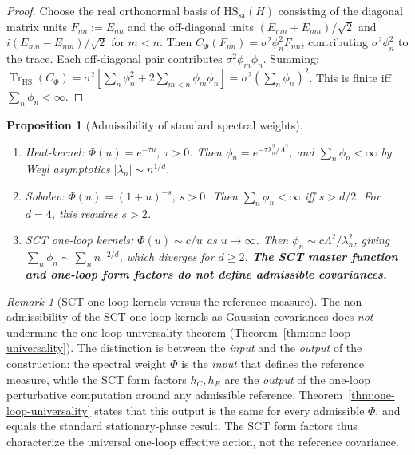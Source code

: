 \documentclass[12pt,a4paper]{article}
\theoremstyle{plain}
\newtheorem{proposition}[theorem]{Proposition}
\theoremstyle{definition}
\theoremstyle{remark}
\newtheorem{remark}[theorem]{Remark}
\newcommand{\Tr}{\operatorname{Tr}}
\newcommand{\HS}{\mathrm{HS}}
\newcommand{\sa}{\mathrm{sa}}
\newcommand{\Lam}{\Lambda}
\begin{document}
\begin{proof}
Choose the real orthonormal basis of $\HS_\sa(H)$ consisting of the
diagonal matrix units $F_{nn} := E_{nn}$ and the off-diagonal units
$(E_{mn} + E_{nm})/\sqrt{2}$ and $i(E_{mn} - E_{nm})/\sqrt{2}$ for
$m < n$.  Then $C_\Phi(F_{nn}) = \sigma^2 \phi_n^2 F_{nn}$,
contributing $\sigma^2\phi_n^2$ to the trace.  Each off-diagonal pair
contributes $\sigma^2 \phi_m\phi_n$.  Summing:
$\Tr_{\HS}(C_\Phi) = \sigma^2[\sum_n \phi_n^2 + 2\sum_{m<n}
\phi_m\phi_n] = \sigma^2(\sum_n \phi_n)^2$.  This is finite iff
$\sum_n \phi_n < \infty$.
\end{proof}

\begin{proposition}[Admissibility of standard spectral weights]
\label{prop:admissibility}
\hfill
\begin{enumerate}[label=\textup{(\alph*)},leftmargin=2.5em]
  \item Heat-kernel: $\Phi(u) = e^{-\tau u}$, $\tau > 0$.  Then
    $\phi_n = e^{-\tau\lambda_n^2/\Lam^2}$, and $\sum_n \phi_n <
    \infty$ by Weyl asymptotics $|\lambda_n| \sim n^{1/d}$.
  \item Sobolev: $\Phi(u) = (1+u)^{-s}$, $s > 0$.  Then $\sum_n
    \phi_n < \infty$ iff $s > d/2$.  For $d=4$, this requires $s > 2$.
  \item SCT one-loop kernels: $\Phi(u) \sim c/u$ as $u \to \infty$.
    Then $\phi_n \sim c\Lam^2/\lambda_n^2$, giving $\sum_n \phi_n
    \sim \sum_n n^{-2/d}$, which diverges for $d \ge 2$.
    \textbf{The SCT master function and one-loop form factors do not
    define admissible covariances.}
\end{enumerate}
\end{proposition}

\begin{remark}[SCT one-loop kernels versus the reference measure]
\label{rem:kernels-vs-reference}
The non-admissibility of the SCT one-loop kernels as Gaussian
covariances does \emph{not} undermine the one-loop universality
theorem (Theorem~\ref{thm:one-loop-universality}).  The distinction
is between the \emph{input} and the \emph{output} of the construction:
the spectral weight $\Phi$ is the \emph{input} that defines the
reference measure, while the SCT form factors $h_C, h_R$ are the
\emph{output} of the one-loop perturbative computation around any
admissible reference.  Theorem~\ref{thm:one-loop-universality}
states that this output is the same for every admissible $\Phi$,
and equals the standard stationary-phase result.  The SCT form factors
thus characterize the universal one-loop effective action, not the
reference covariance.
\end{remark}
\end{document}
